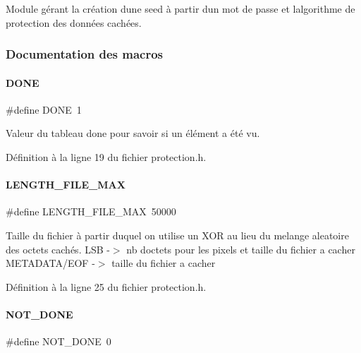 Module gérant la création d\textquotesingle{}une seed à partir d\textquotesingle{}un mot de passe et l\textquotesingle{}algorithme de protection des données cachées. 

\subsubsection{Documentation des macros}
\mbox{\label{a00119_abe6b865c045f3e7c6892ef4f15ff5779}} 
\paragraph{\texorpdfstring{D\+O\+NE}{DONE}}
{\footnotesize\ttfamily \#define D\+O\+NE~1}

Valeur du tableau done pour savoir si un élément a été vu. 

Définition à la ligne 19 du fichier protection.\+h.

\mbox{\label{a00119_ac2d0f772f04858c22e5fd79f389c292e}} 
\paragraph{\texorpdfstring{L\+E\+N\+G\+T\+H\+\_\+\+F\+I\+L\+E\+\_\+\+M\+AX}{LENGTH\_FILE\_MAX}}
{\footnotesize\ttfamily \#define L\+E\+N\+G\+T\+H\+\_\+\+F\+I\+L\+E\+\_\+\+M\+AX~50000}

Taille du fichier à partir duquel on utilise un X\+OR au lieu du melange aleatoire des octets cachés. L\+SB -\/$>$ nb d\textquotesingle{}octets pour les pixels et taille du fichier a cacher M\+E\+T\+A\+D\+A\+T\+A/\+E\+OF -\/$>$ taille du fichier a cacher 

Définition à la ligne 25 du fichier protection.\+h.

\mbox{\label{a00119_ad218e8b240a4eb9f91a18104c2c53efd}} 
\paragraph{\texorpdfstring{N\+O\+T\+\_\+\+D\+O\+NE}{NOT\_DONE}}
{\footnotesize\ttfamily \#define N\+O\+T\+\_\+\+D\+O\+NE~0}

